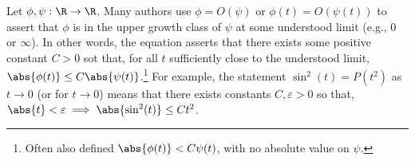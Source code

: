 Let $\phi, \psi: \R \to \R$.
Many authors use $\phi = O(\psi)$ or $\phi(t) = O(\psi(t))$ to assert that $\phi$ is in the upper growth class of $\psi$ at some understood limit (e.g., $0$ or $\infty$).
In other words, the equation asserts that there exists some positive constant $C > 0$ sot that, for all $t$ sufficiently close to the understood limit, $\abs{\phi(t)} \leq C \abs{\psi(t)}$.\footnote{Often also defined $\abs{\phi(t)} < C\psi(t)$, with no absolute value on $\psi$.}
For example, the statement $\sin^2(t) = P(t^2)$ as $t \to 0$ (or for $t \to 0$) means that there exists constants $C, \varepsilon > 0$ so that, $\abs{t} < \varepsilon \implies \abs{\sin^2(t)} \leq Ct^2$.


